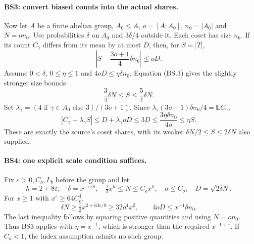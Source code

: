 \paragraph{BS3: convert biased counts into the actual shares.}
Now let $A$ be a finite abelian group, $A_0\le A$,
$o=[A:A_0]$, $n_0=|A_0|$ and $N=on_0$.
Use probabilities $\delta$ on $A_0$ and $3\delta/4$ outside it.
Each coset has size $n_0$. If its count $C_\gamma$ differs from its
mean by at most $D$, then, for $S=|T|$,
\[
 \left|S-\frac{3o+1}{4}\delta n_0\right|\le oD.
                                                        \tag{BS.3}
\]
Assume $0<\delta$, $0\le\eta\le1$ and
$4oD\le\eta\delta n_0$. Equation (BS.3) gives the slightly
stronger size bounds
\[
 \frac34\delta N\le S\le\frac54\delta N.
                                                        \tag{BS.4}
\]
Set $\lambda_\gamma=(4\text{ if }\gamma\in A_0
\text{ else }3)/(3o+1)$. Since
$\lambda_\gamma(3o+1)\delta n_0/4=\mathbb EC_\gamma$,
\[
 |C_\gamma-\lambda_\gamma S|
 \le D+\lambda_\gamma oD\le3D
 \le\frac{3\eta\delta n_0}{4o}
 \le\eta S.                                            \tag{BS.5}
\]
These are exactly the source's coset shares, with its weaker
$\delta N/2\le S\le2\delta N$ also supplied.

\paragraph{BS4: one explicit scale condition suffices.}
Fix $\varepsilon>0,C_o,L_b$ before the group and let
\[
 h=2+8\varepsilon,\quad
 \delta=x^{-\varepsilon/8},\quad
 \tfrac12x^h\le N\le C_ox^h,\quad o\le C_o,\quad
 D=\sqrt{2\delta N}.
\]
For $x\ge1$ with $x^\varepsilon\ge64C_o^4$,
\[
 \delta N\ge\tfrac12x^{2+63\varepsilon/8}
 \ge32o^4x^2,
 \qquad
 4oD\le x^{-1}\delta n_0.                            \tag{BS.6}
\]
The last inequality follows by squaring positive quantities and
using $N=on_0$. Thus BS3 applies with $\eta=x^{-1}$,
which is stronger than the required $x^{-1+\varepsilon}$.
If $C_o<1$, the index assumption admits no such group.

